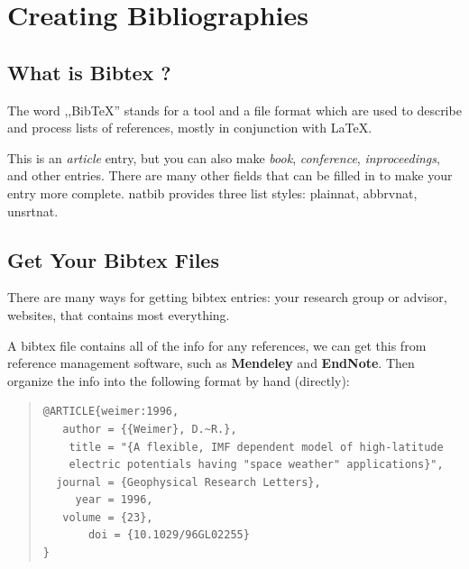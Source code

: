 \documentclass[12pt, letterpaper]{article} %
\begin{document}
\section{Creating Bibliographies} %
\subsection{What is Bibtex ?} %
The word ,,BibTeX'' stands for a tool and a file format which are used to describe 
and process lists of references, mostly in conjunction with \LaTeX.

This is an {\it article} entry, but you can also make {\it book}, 
{\it conference}, {\it inproceedings}, and other entries.  There are many other
fields that can be filled in to make your entry more complete.  natbib provides 
three list styles: plainnat, abbrvnat, unsrtnat.

\subsection{Get Your Bibtex Files} %
There are many ways for getting bibtex entries: your research 
group or advisor, websites, that contains most everything.  

A bibtex file contains all of the info for any references, 
we can get this from reference management software, 
such as \textbf{Mendeley} and \textbf{EndNote}. Then 
organize the info into the following format by hand (directly):

\begin{quote} %
\begin{verbatim} 
@ARTICLE{weimer:1996,
   author = {{Weimer}, D.~R.},
    title = "{A flexible, IMF dependent model of high-latitude 
    electric potentials having "space weather" applications}",
  journal = {Geophysical Research Letters},
     year = 1996,
   volume = {23},
       doi = {10.1029/96GL02255}
}
\end{verbatim} %
\end{quote} %
\end{document}
